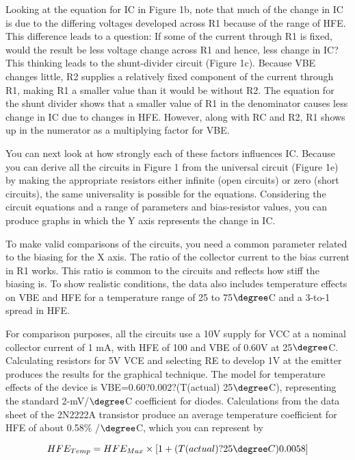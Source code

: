 Looking at the equation for IC in Figure 1b, note that much of the change in IC is due to the differing voltages developed across R1 because of the range of HFE. This difference leads to a question: If some of the current through R1 is fixed, would the result be less voltage change across R1 and hence, less change in IC? This thinking leads to the shunt-divider circuit (Figure 1c). Because VBE changes little, R2 supplies a relatively fixed component of the current through R1, making R1 a smaller value than it would be without R2. The equation for the shunt divider shows that a smaller value of R1 in the denominator causes less change in IC due to changes in HFE. However, along with RC and R2, R1 shows up in the numerator as a multiplying factor for VBE.

\bigskip

You can next look at how strongly each of these factors influences IC. Because you can derive all the circuits in Figure 1 from the universal circuit (Figure 1e) by making the appropriate resistors either infinite (open circuits) or zero (short circuits), the same universality is possible for the equations. Considering the circuit equations and a range of parameters and bias-resistor values, you can produce graphs in which the Y axis represents the change in IC.

To make valid comparisons of the circuits, you need a common parameter related to the biasing for the X axis. The ratio of the collector current to the bias current in R1 works. This ratio is common to the circuits and reflects how stiff the biasing is. To show realistic conditions, the data also includes temperature effects on VBE and HFE for a temperature range of 25 to 75$\degree$C and a 3-to-1 spread in HFE.

For comparison purposes, all the circuits use a 10V supply for VCC at a nominal collector current of 1 mA, with HFE of 100 and VBE of 0.60V at 25$\degree$C. Calculating resistors for 5V VCE and selecting RE to develop 1V at the emitter produces the results for the graphical technique. The model for temperature effects of the device is VBE=0.60?0.002?(T(actual) 25$\degree$C), representing the standard 2-mV/$\degree$C coefficient for diodes. Calculations from the data sheet of the 2N2222A transistor produce an average temperature coefficient for HFE of about 0.58\% /$\degree$C, which you can represent by 

\begin{equation}
HFE_{Temp} =  HFE_{Max}  \times [1+(T(actual)?25\degree C)0.0058] 
\end{equation}

